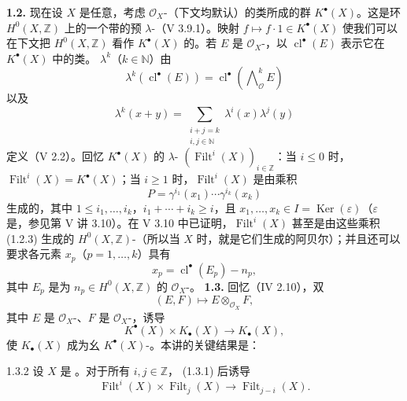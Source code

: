\textbf{1.2.} 现在设 $X$ 是任意，考虑 $\mathcal O_X$-（下文均默认）的类所成的群 $K^\bullet(X)$。这是环 $H^0(X,\mathbb Z)$ 上的一个带的预 $\lambda$-（V 3.9.1）。映射 $f\longmapsto f\cdot1\in K^\bullet(X)$ 使我们可以在下文把 $H^0(X,\mathbb Z)$ 看作 $K^\bullet(X)$ 的。若 $E$ 是 $\mathcal O_X$-，以 $\operatorname{cl}^\bullet(E)$ 表示它在 $K^\bullet(X)$ 中的类。 $\lambda^k$（$k\in\mathbb N$）由
\[\lambda^k(\operatorname{cl}^\bullet(E))=\operatorname{cl}^\bullet(\mathop{\bigwedge}\nolimits^k_{\mathcal O}E)\tag{1.2.1}\]
以及
\[\lambda^k(x+y)=\sum_{\substack{i+j=k\\i,j\in\mathbb N}}\lambda^i(x)\lambda^j(y)\tag{1.2.2}\]
定义（V 2.2）。回忆 $K^\bullet(X)$ 的 $\lambda$- $(\operatorname{Filt}^i(X))_{i\in\mathbb Z}$：当 $i\leq0$ 时，$\operatorname{Filt}^i(X)=K^\bullet(X)$；当 $i\geq1$ 时，$\operatorname{Filt}^i(X)$ 是由乘积
\[P=\gamma^{i_1}(x_1)\cdots\gamma^{i_k}(x_k)\tag{1.2.3}\]
生成的，其中 $1\leq i_1,\ldots,i_k$，$i_1+\cdots+i_k\geq i$，且 $x_1,\ldots,x_k\in I=\operatorname{Ker}(\varepsilon)$（$\varepsilon$ 是，参见第 V 讲 3.10）。在 V 3.10 中已证明，$\operatorname{Filt}^i(X)$ 甚至是由这些乘积 (1.2.3) 生成的 $H^0(X,\mathbb Z)$-（所以当 $X$ 时，就是它们生成的阿贝尔）；并且还可以要求各元素 $x_p$（$p=1,\ldots,k$）具有
\[x_p=\operatorname{cl}^\bullet(E_p)-n_p,\tag{1.2.4}\]
其中 $E_p$ 是为 $n_p\in H^0(X,\mathbb Z)$ 的 $\mathcal O_X$-。
\textbf{1.3.} 回忆（IV 2.10），双
\[(E,F)\longmapsto E\otimes_{\mathcal O_X}F,\]
其中 $E$ 是 $\mathcal O_X$-、$F$ 是 $\mathcal O_X$-，诱导
\[K^\bullet(X)\times K_\bullet(X)\longrightarrow K_\bullet(X),\tag{1.3.1}\]
使 $K_\bullet(X)$ 成为幺 $K^\bullet(X)$-。本讲的关键结果是：
\begin{SGAresult}{}{1.3.2}
设 $X$ 是  。对于所有 $i,j\in\mathbb Z$， (1.3.1) 后诱导
\[\operatorname{Filt}^i(X)\times\operatorname{Filt}_j(X)\longrightarrow\operatorname{Filt}_{j-i}(X).\tag{1.3.3}\]
\end{SGAresult}
